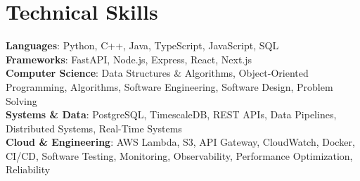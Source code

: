 \documentclass[letterpaper,11pt]{article}
\begin{document}
\section{Technical Skills}
 \begin{itemize}[leftmargin=0.15in, label={}]
    \small{\item{
     \textbf{Languages}{: Python, C++, Java, TypeScript, JavaScript, SQL} \\
     \textbf{Frameworks}{: FastAPI, Node.js, Express, React, Next.js} \\
     \textbf{Computer Science}{: Data Structures \& Algorithms, Object-Oriented Programming, Algorithms, Software Engineering, Software Design, Problem Solving} \\
     \textbf{Systems \& Data}{: PostgreSQL, TimescaleDB, REST APIs, Data Pipelines, Distributed Systems, Real-Time Systems} \\
     \textbf{Cloud \& Engineering}{: AWS Lambda, S3, API Gateway, CloudWatch, Docker, CI/CD, Software Testing, Monitoring, Observability, Performance Optimization, Reliability}
    }}
 \end{itemize}

\end{document}
